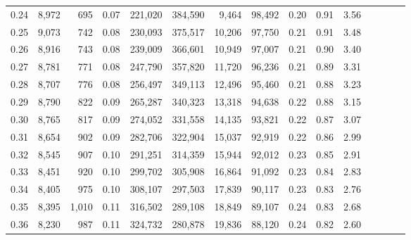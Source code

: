 \begin{tabular}{rrrcrrrrrrrrrrr}
0.24 &   8,972 &    695 &                                       0.07 &  221,020 &  384,590 &    9,464 &   98,492 &  0.20 &  0.91 &                         3.56 \\
0.25 &   9,073 &    742 &                                       0.08 &  230,093 &  375,517 &   10,206 &   97,750 &  0.21 &  0.91 &                         3.48 \\
0.26 &   8,916 &    743 &                                       0.08 &  239,009 &  366,601 &   10,949 &   97,007 &  0.21 &  0.90 &                         3.40 \\
0.27 &   8,781 &    771 &                                       0.08 &  247,790 &  357,820 &   11,720 &   96,236 &  0.21 &  0.89 &                         3.31 \\
0.28 &   8,707 &    776 &                                       0.08 &  256,497 &  349,113 &   12,496 &   95,460 &  0.21 &  0.88 &                         3.23 \\
0.29 &   8,790 &    822 &                                       0.09 &  265,287 &  340,323 &   13,318 &   94,638 &  0.22 &  0.88 &                         3.15 \\
0.30 &   8,765 &    817 &                                       0.09 &  274,052 &  331,558 &   14,135 &   93,821 &  0.22 &  0.87 &                         3.07 \\
0.31 &   8,654 &    902 &                                       0.09 &  282,706 &  322,904 &   15,037 &   92,919 &  0.22 &  0.86 &                         2.99 \\
0.32 &   8,545 &    907 &                                       0.10 &  291,251 &  314,359 &   15,944 &   92,012 &  0.23 &  0.85 &                         2.91 \\
0.33 &   8,451 &    920 &                                       0.10 &  299,702 &  305,908 &   16,864 &   91,092 &  0.23 &  0.84 &                         2.83 \\
0.34 &   8,405 &    975 &                                       0.10 &  308,107 &  297,503 &   17,839 &   90,117 &  0.23 &  0.83 &                         2.76 \\
0.35 &   8,395 &  1,010 &                                       0.11 &  316,502 &  289,108 &   18,849 &   89,107 &  0.24 &  0.83 &                         2.68 \\
0.36 &   8,230 &    987 &                                       0.11 &  324,732 &  280,878 &   19,836 &   88,120 &  0.24 &  0.82 &                         2.60 \\

\end{tabular}

